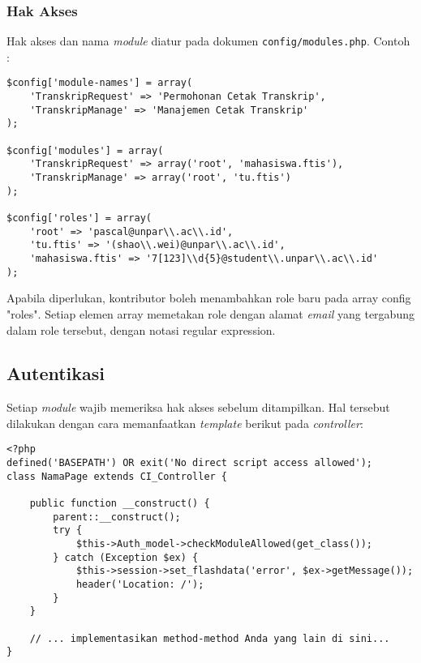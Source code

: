 	\subsubsection{Hak Akses}
		Hak akses dan nama \textit{module} diatur pada dokumen \texttt{config/modules.php}. Contoh :
\begin{lstlisting}
$config['module-names'] = array(
    'TranskripRequest' => 'Permohonan Cetak Transkrip',
    'TranskripManage' => 'Manajemen Cetak Transkrip'
);

$config['modules'] = array(
    'TranskripRequest' => array('root', 'mahasiswa.ftis'),
    'TranskripManage' => array('root', 'tu.ftis')
);

$config['roles'] = array(
    'root' => 'pascal@unpar\\.ac\\.id',
    'tu.ftis' => '(shao\\.wei)@unpar\\.ac\\.id',
    'mahasiswa.ftis' => '7[123]\\d{5}@student\\.unpar\\.ac\\.id'
);
\end{lstlisting}
	
		Apabila diperlukan, kontributor boleh menambahkan role baru pada array config "roles". Setiap elemen array memetakan role dengan alamat \textit{email} yang tergabung dalam role tersebut, dengan notasi regular expression.

\subsection{Autentikasi}
	Setiap \textit{module} wajib memeriksa hak akses sebelum ditampilkan. Hal tersebut dilakukan dengan cara memanfaatkan \textit{template} berikut pada \textit{controller}:
\begin{lstlisting}
<?php
defined('BASEPATH') OR exit('No direct script access allowed');
class NamaPage extends CI_Controller {

    public function __construct() {
        parent::__construct();
        try {
            $this->Auth_model->checkModuleAllowed(get_class());
        } catch (Exception $ex) {
            $this->session->set_flashdata('error', $ex->getMessage());
            header('Location: /');
        }
    }

    // ... implementasikan method-method Anda yang lain di sini...
}
\end{lstlisting}

